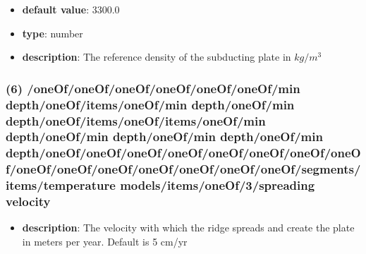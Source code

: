 \begin{itemize}[leftmargin=6em]\item {\bf default value}: 3300.0
\item {\bf type}: number
\item {\bf description}: The reference density of the subducting plate in $kg/m^3$
\end{itemize}\subsubsection{(6) /oneOf/oneOf/oneOf/oneOf/oneOf/oneOf/min depth/oneOf/items/oneOf/min depth/oneOf/min depth/oneOf/items/oneOf/items/oneOf/min depth/oneOf/min depth/oneOf/min depth/oneOf/min depth/oneOf/oneOf/oneOf/oneOf/oneOf/oneOf/oneOf/oneOf/oneOf/oneOf/oneOf/oneOf/oneOf/oneOf/oneOf/segments/items/temperature models/items/oneOf/3/spreading velocity}
\begin{itemize}[leftmargin=6em]\item {\bf description}: The velocity with which the ridge spreads and create the plate in meters per year. Default is 5 cm/yr
\end{itemize}
